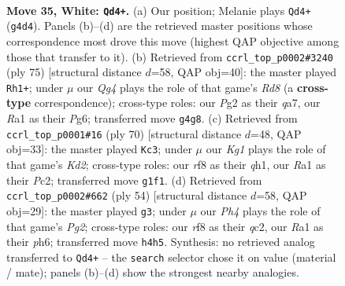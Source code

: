 \documentclass[11pt]{article}
\begin{document}
\clearpage

\begin{figure}[p]\centering
\begin{subfigure}{0.46\textwidth}\centering
\resizebox{\linewidth}{!}{%
\newchessgame
\chessboard[
  setfen={5r1k/1r5p/1p6/p7/2N3QP/8/PP3PP1/R5K1 w - - 7 35},
  showmover=false,
  pgfstyle=straightmove, color=movearrow, markmove={g4-d4}
]}
\caption{}
\end{subfigure}\hfill
\begin{subfigure}{0.46\textwidth}\centering
\resizebox{\linewidth}{!}{%
\newchessgame
\chessboard[
  setfen={8/Q7/2p2kp1/3qp2p/8/1P5P/2R2PPK/3r4 b - - 2 38},
  showmover=false,
  pgfstyle=straightmove, color=movearrow, markmove={d1-h1}
]}
\caption{}
\end{subfigure}
\\[4pt]
\begin{subfigure}{0.46\textwidth}\centering
\resizebox{\linewidth}{!}{%
\newchessgame
\chessboard[
  setfen={k3r3/1p3p2/p2p4/8/3Q1R1P/8/1PPK1P2/7q w - - 4 36},
  showmover=false,
  pgfstyle=straightmove, color=movearrow, markmove={d2-c3}
]}
\caption{}
\end{subfigure}\hfill
\begin{subfigure}{0.46\textwidth}\centering
\resizebox{\linewidth}{!}{%
\newchessgame
\chessboard[
  setfen={5rk1/1Q1R1pp1/7p/p7/8/4P2P/2q2PP1/6K1 w - - 3 28},
  showmover=false,
  pgfstyle=straightmove, color=movearrow, markmove={g2-g3}
]}
\caption{}
\end{subfigure}
\caption{\textbf{Move 35, White: \texttt{Qd4+}.} (a) Our position; Melanie plays \texttt{Qd4+} (\texttt{g4d4}). Panels (b)--(d) are the retrieved master positions whose correspondence most drove this move (highest QAP objective among those that transfer to it). (b) Retrieved from \texttt{ccrl\_top\_p0002\#3240} (ply 75) [structural distance $d$=58, QAP obj=40]: the master played \texttt{Rh1+}; under $\mu$ our \emph{Qg4} plays the role of that game's \emph{Rd8} (a \textbf{cross-type} correspondence); cross-type roles: our \emph{P}g2 as their \emph{q}a7, our \emph{R}a1 as their \emph{P}g6; transferred move \texttt{g4g8}. (c) Retrieved from \texttt{ccrl\_top\_p0001\#16} (ply 70) [structural distance $d$=48, QAP obj=33]: the master played \texttt{Kc3}; under $\mu$ our \emph{Kg1} plays the role of that game's \emph{Kd2}; cross-type roles: our \emph{r}f8 as their \emph{q}h1, our \emph{R}a1 as their \emph{P}c2; transferred move \texttt{g1f1}. (d) Retrieved from \texttt{ccrl\_top\_p0002\#662} (ply 54) [structural distance $d$=58, QAP obj=29]: the master played \texttt{g3}; under $\mu$ our \emph{Ph4} plays the role of that game's \emph{Pg2}; cross-type roles: our \emph{r}f8 as their \emph{q}c2, our \emph{R}a1 as their \emph{p}h6; transferred move \texttt{h4h5}. Synthesis: no retrieved analog transferred to \texttt{Qd4+} -- the \texttt{search} selector chose it on value (material / mate); panels (b)--(d) show the strongest nearby analogies.}
\label{fig:thought-m68}
\end{figure}
\end{document}
